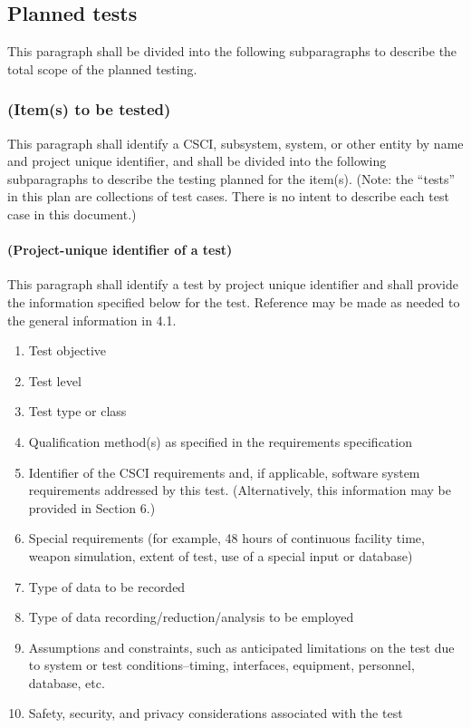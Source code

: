 \documentclass{fidata-report-template}
\begin{document}
\subsection{Planned tests}

This paragraph shall be divided into the following subparagraphs to
describe the total scope of the planned testing.

\subsubsection{(Item(s) to be tested)}

This paragraph shall identify a CSCI, subsystem, system, or other entity
by name and project unique identifier, and shall be divided into the
following subparagraphs to describe the testing planned for the item(s).
(Note: the ``tests'' in this plan are collections of test cases. There
is no intent to describe each test case in this document.)

\paragraph{(Project-unique identifier of a test)}

This paragraph shall identify a test by project unique identifier and
shall provide the information specified below for the test. Reference
may be made as needed to the general information in 4.1.

\begin{enumerate}
\itemsep1pt\parskip0pt
\item
  Test objective
\item
  Test level
\item
  Test type or class
\item
  Qualification method(s) as specified in the requirements specification
\item
  Identifier of the CSCI requirements and, if applicable, software
  system requirements addressed by this test. (Alternatively, this
  information may be provided in Section 6.)
\item
  Special requirements (for example, 48 hours of continuous facility
  time, weapon simulation, extent of test, use of a special input or
  database)
\item
  Type of data to be recorded
\item
  Type of data recording/reduction/analysis to be employed
\item
  Assumptions and constraints, such as anticipated limitations on the
  test due to system or test conditions--timing, interfaces, equipment,
  personnel, database, etc.
\item
  Safety, security, and privacy considerations associated with the test
\end{enumerate}
\end{document}
